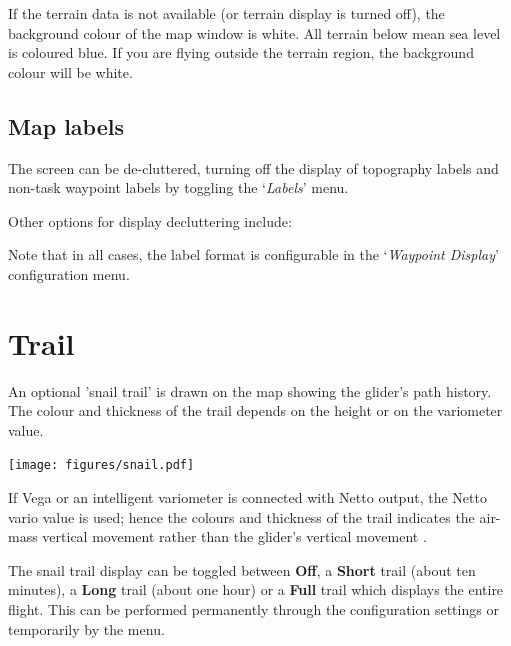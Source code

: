 If the terrain data is not available (or terrain display is turned
off), the background colour of the map window is white.  All terrain
below mean sea level is coloured blue.  If you are flying outside the
terrain region, the background colour will be white.

\subsection*{Map labels}\label{sec:maplabels}

The screen can be de-cluttered, turning off the display of topography
labels and non-task waypoint labels by toggling the `{\it Labels}' menu.

Other options for display decluttering include:


Note that in all cases, the label format is configurable in the
`{\it Waypoint Display}' configuration menu.  


\section{Trail}\label{sec:trail}

An optional 'snail trail' is drawn on the map showing the glider's
path history.  The colour and thickness of the trail depends on the height or
on the variometer value.

\begin{center}
\texttt{[image: figures/snail.pdf]}
\end{center}

If Vega or an intelligent variometer is connected with Netto output,
the Netto vario value is used; hence the colours and thickness of the
trail indicates the air-mass vertical movement rather than the glider's
vertical movement	.

The snail trail display can be toggled between {\bf Off}, a {\bf Short} trail
(about ten minutes), a {\bf Long} trail (about one hour) or a {\bf Full} trail
which displays the entire flight.  This can be performed permanently
through the configuration settings or temporarily by the
menu.

